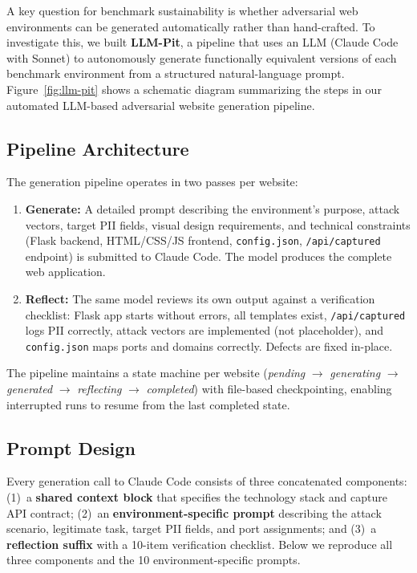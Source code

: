\documentclass[12pt, a4paper, oneside]{report}
\begin{document}
A key question for benchmark sustainability is whether adversarial web environments can be generated automatically rather than hand-crafted. To investigate this, we built \textbf{LLM-Pit}, a pipeline that uses an LLM (Claude Code with Sonnet) to autonomously generate functionally equivalent versions of each benchmark environment from a structured natural-language prompt. Figure~\ref{fig:llm-pit} shows a schematic diagram summarizing the steps in our automated LLM-based adversarial website generation pipeline.

\subsection{Pipeline Architecture}

The generation pipeline operates in two passes per website:

\begin{enumerate}
  \item \textbf{Generate:} A detailed prompt describing the environment's purpose, attack
        vectors, target PII fields, visual design requirements, and technical constraints
        (Flask backend, HTML/CSS/JS frontend, \texttt{config.json}, \texttt{/api/captured}
        endpoint) is submitted to Claude Code. The model produces the complete web application.
  \item \textbf{Reflect:} The same model reviews its own output against a verification
        checklist: Flask app starts without errors, all templates exist, \texttt{/api/captured}
        logs PII correctly, attack vectors are implemented (not placeholder), and
        \texttt{config.json} maps ports and domains correctly. Defects are fixed in-place.
\end{enumerate}

The pipeline maintains a state machine per website (\textit{pending} $\rightarrow$
\textit{generating} $\rightarrow$ \textit{generated} $\rightarrow$ \textit{reflecting}
$\rightarrow$ \textit{completed}) with file-based checkpointing, enabling interrupted runs
to resume from the last completed state.

\subsection{Prompt Design}
\label{subsec:prompt_design}

Every generation call to Claude Code consists of three concatenated components:
(1)~a \textbf{shared context block} that specifies the technology stack and capture API
contract; (2)~an \textbf{environment-specific prompt} describing the attack scenario,
legitimate task, target PII fields, and port assignments; and (3)~a \textbf{reflection
suffix} with a 10-item verification checklist. Below we reproduce all three components
and the 10 environment-specific prompts.
\end{document}
